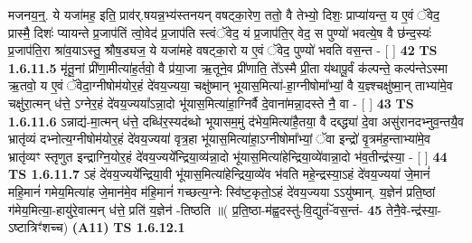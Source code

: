 \documentclass[17pt]{extarticle}
\begin{document}
                  मजनय॒न्॒. ये यजा॑मह॒ इति॒ प्राव॑र्.षयन्न॒भ्य॑स्तनयन् वषट्का॒रेण॒ ततो॒ वै तेभ्यो॒ दिशः॒ प्राप्या॑यन्त॒ य ए॒वं ॅवेद॒ प्रास्मै॒ दिशः॑ प्यायन्ते प्र॒जाप॑तिं त्वो॒वेद॑ प्र॒जाप॑ति स्त्वंॅवेद॒ यं प्र॒जाप॑ति॒र् वेद॒ स पुण्यो॑ भवत्ये॒ष वै छ॑न्द॒स्यः॑ प्र॒जाप॑ति॒रा श्रा॑व॒याऽस्तु॒ श्रौष॒ड्यज॒ ये यजा॑महे वषट्का॒रो य ए॒वं ॅवेद॒ पुण्यो॑ भवति वस॒न्त - [ ] \textbf{  42} \newline
                  \newline
                                \textbf{ TS 1.6.11.5} \newline
                  मृ॑तू॒नां प्री॑णा॒मीत्या॑ह॒र्तवो॒ वै प्र॑या॒जा ऋ॒तूने॒व प्री॑णाति॒ ते᳚ऽस्मै प्री॒ता य॑थापू॒र्वं क॑ल्पन्ते॒ कल्प॑न्तेऽस्मा ऋ॒तवो॒ य ए॒वं ॅवेदा॒ग्नीषोम॑योर॒हं दे॑वय॒ज्यया॒ चक्षु॑ष्मान् भूयास॒मित्या॑-हा॒ग्नीषोमा᳚भ्यां॒ वै य॒ज्ञ्श्चक्षु॑ष्मा॒न् ताभ्या॑मे॒व चक्षु॑रा॒त्मन् ध॑त्ते॒ ऽग्नेर॒हं दे॑वय॒ज्यया᳚ऽन्ना॒दो भू॑यास॒मित्या॑हा॒ग्निर्वै दे॒वाना॑मन्ना॒दस्ते नै॒ वा - [ ] \textbf{  43} \newline
                  \newline
                                \textbf{ TS 1.6.11.6} \newline
                  ऽन्नाद्य॑-मा॒त्मन् ध॑त्ते॒ दब्धि॑र॒स्यद॑ब्धो भूयासम॒मुं द॑भेय॒मित्या॑है॒तया॒ वै दब्द्ध्या॑ दे॒वा असु॑रानदभ्नुव॒न्तयै॒व भ्रातृ॑व्यं दभ्नोत्य॒ग्नीषोम॑योर॒हं दे॑वय॒ज्यया॑ वृत्र॒हा भू॑यास॒मित्या॑हा॒ऽग्नीषोमा᳚भ्यां॒ ॅवा इन्द्रो॑ वृ॒त्रम॑ह॒न्ताभ्या॑मे॒व भ्रातृ॑व्यꣳ स्तृणुत इन्द्राग्नि॒योर॒हं दे॑वय॒ज्यये᳚न्द्रिया॒व्य॑न्ना॒दो भू॑यास॒मित्या॑हेन्द्रिया॒व्ये॑वान्ना॒दो भ॑व॒तीन्द्र॑स्या॒ - [ ] \textbf{  44} \newline
                  \newline
                                \textbf{ TS 1.6.11.7} \newline
                  ऽहं दे॑वय॒ज्यये᳚न्द्रिया॒वी भू॑यास॒मित्या॑हेन्द्रिया॒व्ये॑व भ॑वति महे॒न्द्रस्या॒ऽहं दे॑वय॒ज्यया॑ जे॒मानं॑ महि॒मानं॑ गमेय॒मित्या॑ह जे॒मान॑मे॒व म॑हि॒मानं॑ गच्छत्य॒ग्नेः स्वि॑ष्ट॒कृतो॒ऽहं दे॑वय॒ज्यया ऽऽयु॑ष्मान्. य॒ज्ञेन॑ प्रति॒ष्ठां ग॑मेय॒मित्या॒-हायु॑रे॒वात्मन् ध॑त्ते॒ प्रति॑ य॒ज्ञेन॑ -तिष्ठति ॥( प्र॒ति॒ष्ठा-म॑ह्व॒दस्तु॑-वि॒द्युतं॑-ॅवस॒न्तं- \textbf{  45} \newline
                  \newline
                      तेनै॒वे-न्द्र॑स्या॒-ऽष्टात्रिꣳ॑शच्च)  \textbf{(A11)} \newline \newline
                                        \textbf{ TS 1.6.12.1} \newline
\end{document}
